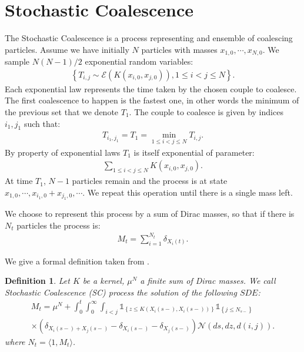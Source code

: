 \documentclass[11pt,a4paper]{article}
\newcommand{\indic}[1]{\mathds{1}_{\left\lbrace#1\right\rbrace}}
\newcommand{\SC}{{\emph{SC}}}
\newtheorem{definition}[theorem]{Definition}
\begin{document}
\section{Stochastic Coalescence}
The Stochastic Coalescence is a process representing and ensemble of coalescing particles. Assume we have initially $N$ particles with masses $x_{1,0},\cdots,x_{N,0}$. We sample $N(N-1)/2$ exponential random variables:
\begin{align*}
    \left\lbrace T_{i,j} \sim \mathcal{E}\left(K(x_{i,0},x_{j,0})\right), 1 \leq i < j \leq N \right\rbrace.
\end{align*}
Each exponential law represents the time taken by the chosen couple to coalesce. The first coalescence to happen is the fastest one, in other words the minimum of the previous set that we denote $T_1$. The couple to coalesce is given by indices $i_1,j_1$ such that:
\begin{align*}
    T_{i_1,j_1} = T_1 = \min\limits_{1 \leq i < j \leq N} T_{i,j}.
\end{align*}
By property of exponential laws $T_1$ is itself exponential of parameter:
\begin{align*}
    \sum\limits_{1 \leq i < j \leq N}K(x_{i,0},x_{j,0}).
\end{align*}
At time $T_1$, $N-1$ particles remain and the process is at state $x_{1,0},\cdots , x_{i_1,0}+x_{j_1,0},\cdots$. We repeat this operation until there is a single mass left.

We choose to represent this process by a sum of Dirac masses, so that if there is $N_t$ particles the process is:
\begin{align*}
    M_t = \sum\limits_{i = 1}^{N_t} \delta_{X_{i}(t)}.
\end{align*}

We give a formal definition taken from \cite{fournier2006some,fournier2009stochastic}.
\begin{definition}
    Let $K$ be a kernel, $\mu^N$ a finite sum of Dirac masses. We call Stochastic Coalescence (\SC) process the solution of the following $SDE$:
    \begin{multline*}
        M_t = \mu^N + \int_0^t \int_0^\infty \int_{i <j }  \indic{z \leq K(X_{i}(s-),X_{i}(s-))} \indic{j \leq N_{s-}} \\ \times \left(\delta_{X_{i}(s-) + X_{j}(s-)} - \delta_{X_{i}(s-)} - \delta_{X_{j}(s-)}\right)\mathcal{N}(ds,dz,d(i,j)).
    \end{multline*}
    where $N_t = \langle 1 , M_t\rangle$.
\end{definition}
\end{document}
